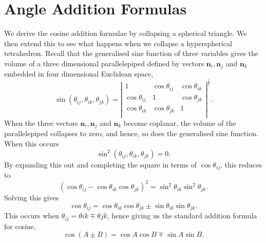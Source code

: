 \documentclass[fleqn,11pt,twoside]{article}
\theoremstyle{definition}
\begin{document}
\section{Angle Addition Formulas}
\def\theequation{B\arabic{equation}}
\setcounter{equation}{0}

We derive the cosine addition formulae by collapsing a spherical triangle. We then extend this to see what happens when we collapse a hyperspherical tetrahedron. Recall that the generalised sine function of three variables gives the volume of a three dimensional parallelepiped defined by vectors $\mathbf{n}_i,\mathbf{n}_j$ and $\mathbf{n}_k$ embedded in four dimensional Euclidean space,
\begin{equation}
\sin(\theta_{ij},\theta_{ik},\theta_{jk})=\left|\begin{array}{ccc}
1&
\cos\theta_{ij}&
\cos\theta_{ik}\\
\cos\theta_{ij}&
1&
\cos\theta_{jk}\\
\cos\theta_{ik}&
\cos\theta_{jk}&
1\\
\end{array}\right|^\frac{1}{2}.
\end{equation}
When the three vectors $\mathbf{n}_i,\mathbf{n}_j$ and $\mathbf{n}_k$ become coplanar, the volume of the parallelepiped collapses to zero, and hence, so does the generalised sine function. When this occurs
\begin{equation}
\sin^2(\theta_{ij},\theta_{ik},\theta_{jk})=0.
\end{equation}
By expanding this out and completing the square in terms of $\cos\theta_{ij}$, this reduces to
\begin{equation}
(\cos\theta_{ij}-\cos\theta_{ik}\cos\theta_{jk})^2=\sin^2\theta_{ik}\sin^2\theta_{jk}.
\end{equation}
Solving this gives
\begin{equation}
\cos\theta_{ij}=\cos\theta_{ik}\cos\theta_{jk}\pm\sin\theta_{ik}\sin\theta_{jk}.
\end{equation}
This occurs when $\theta_{ij}=\theta{ik}\mp\theta{jk}$, hence giving us the standard addition formula for cosine,
\begin{equation}
\cos(A\pm B)=\cos A\cos B\mp\sin A\sin B.
\end{equation}
\end{document}
